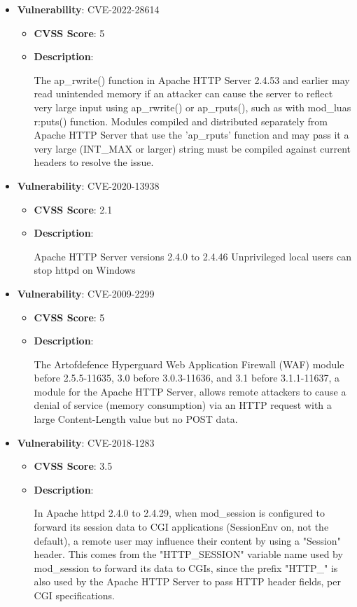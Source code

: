 \documentclass{article}
\begin{document}
\begin{itemize}
        \item \textbf{Vulnerability}: CVE-2022-28614
        \begin{itemize}
            \item \textbf{CVSS Score}:  5 
            \item \textbf{Description}:
            \parbox[t]{0.9\linewidth}{
                \ttfamily The ap\_rwrite() function in Apache HTTP Server 2.4.53 and earlier may read unintended memory if an attacker can cause the server to reflect very large input using ap\_rwrite() or ap\_rputs(), such as with mod\_luas r:puts() function. Modules compiled and distributed separately from Apache HTTP Server that use the 'ap\_rputs' function and may pass it a very large (INT\_MAX or larger) string must be compiled against current headers to resolve the issue.
            }
        \end{itemize}
    
        \item \textbf{Vulnerability}: CVE-2020-13938
        \begin{itemize}
            \item \textbf{CVSS Score}:  2.1 
            \item \textbf{Description}:
            \parbox[t]{0.9\linewidth}{
                \ttfamily Apache HTTP Server versions 2.4.0 to 2.4.46 Unprivileged local users can stop httpd on Windows
            }
        \end{itemize}
    
        \item \textbf{Vulnerability}: CVE-2009-2299
        \begin{itemize}
            \item \textbf{CVSS Score}:  5 
            \item \textbf{Description}:
            \parbox[t]{0.9\linewidth}{
                \ttfamily The Artofdefence Hyperguard Web Application Firewall (WAF) module before 2.5.5-11635, 3.0 before 3.0.3-11636, and 3.1 before 3.1.1-11637, a module for the Apache HTTP Server, allows remote attackers to cause a denial of service (memory consumption) via an HTTP request with a large Content-Length value but no POST data.
            }
        \end{itemize}
    
        \item \textbf{Vulnerability}: CVE-2018-1283
        \begin{itemize}
            \item \textbf{CVSS Score}:  3.5 
            \item \textbf{Description}:
            \parbox[t]{0.9\linewidth}{
                \ttfamily In Apache httpd 2.4.0 to 2.4.29, when mod\_session is configured to forward its session data to CGI applications (SessionEnv on, not the default), a remote user may influence their content by using a "Session" header. This comes from the "HTTP\_SESSION" variable name used by mod\_session to forward its data to CGIs, since the prefix "HTTP\_" is also used by the Apache HTTP Server to pass HTTP header fields, per CGI specifications.
            }
        \end{itemize}
    

\end{itemize}
\end{document}
